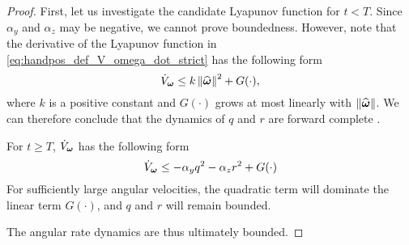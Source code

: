 \begin{proof}
    First, let us investigate the candidate Lyapunov function for $t < T$.
    Since $\alpha_y$ and $\alpha_z$ may be negative, we cannot prove boundedness.
    However, note that the derivative of the Lyapunov function in \eqref{eq:handpos_def_V_omega_dot_strict} has the following form
    \begin{equation}
        \dot{V}_{\bm{\omega}} \leq k \left\|\widehat{\bm{\omega}}\right\|^2 + G(\cdot),
    \end{equation}
    where $k$ is a positive constant and $G(\cdot)$ grows at most linearly with $\left\|\widehat{\bm{\omega}}\right\|$.
    We can therefore conclude that the dynamics of $q$ and $r$ are forward complete \cite{angeli_forward_1999}.

    For $t \geq T$, $\dot{V}_{\bm{\omega}}$ has the following form
    \begin{equation}
        \dot{V}_{\bs{\omega}} \leq -\alpha_yq^2 - \alpha_zr^2 + G(\cdot)%
    \end{equation}
    For sufficiently large angular velocities, the quadratic term will dominate the linear term $G(\cdot)$, and $q$ and $r$ will remain bounded.
    
    The angular rate dynamics are thus ultimately bounded.        
\end{proof}

